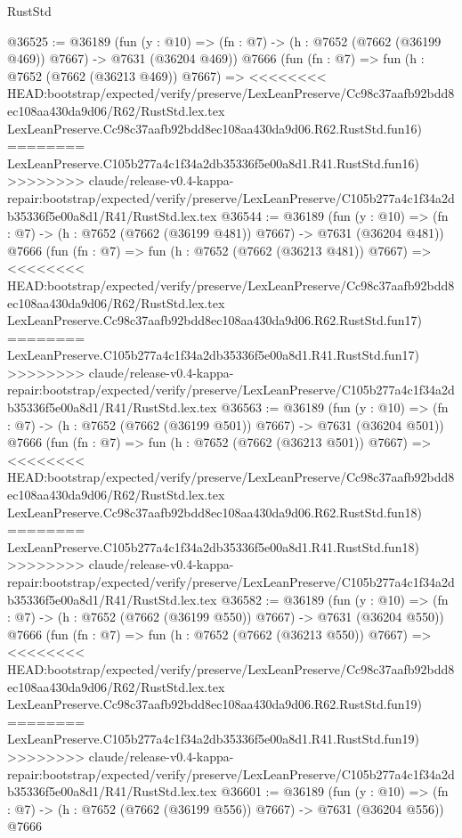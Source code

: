 \begin{lexlean}{RustStd}
\begin{coremodule}
{\begin{coremodule}
{{{{{{{{{{{{{{{{{{{{{{{{{{{{{{{{{{{{{{{{{{{{{{{{{{{{{@36525 := @36189
    (fun (y : @10) => (fn : @7) -> (h : @7652 (@7662 (@36199 @469)) @7667) -> @7631 (@36204 @469))
    @7666
    (fun (fn : @7) =>
    fun (h : @7652 (@7662 (@36213 @469)) @7667) =>
<<<<<<<< HEAD:bootstrap/expected/verify/preserve/LexLeanPreserve/Cc98c37aafb92bdd8ec108aa430da9d06/R62/RustStd.lex.tex
    LexLeanPreserve.Cc98c37aafb92bdd8ec108aa430da9d06.R62.RustStd.fun16)
========
    LexLeanPreserve.C105b277a4c1f34a2db35336f5e00a8d1.R41.RustStd.fun16)
>>>>>>>> claude/release-v0.4-kappa-repair:bootstrap/expected/verify/preserve/LexLeanPreserve/C105b277a4c1f34a2db35336f5e00a8d1/R41/RustStd.lex.tex
@36544 := @36189
    (fun (y : @10) => (fn : @7) -> (h : @7652 (@7662 (@36199 @481)) @7667) -> @7631 (@36204 @481))
    @7666
    (fun (fn : @7) =>
    fun (h : @7652 (@7662 (@36213 @481)) @7667) =>
<<<<<<<< HEAD:bootstrap/expected/verify/preserve/LexLeanPreserve/Cc98c37aafb92bdd8ec108aa430da9d06/R62/RustStd.lex.tex
    LexLeanPreserve.Cc98c37aafb92bdd8ec108aa430da9d06.R62.RustStd.fun17)
========
    LexLeanPreserve.C105b277a4c1f34a2db35336f5e00a8d1.R41.RustStd.fun17)
>>>>>>>> claude/release-v0.4-kappa-repair:bootstrap/expected/verify/preserve/LexLeanPreserve/C105b277a4c1f34a2db35336f5e00a8d1/R41/RustStd.lex.tex
@36563 := @36189
    (fun (y : @10) => (fn : @7) -> (h : @7652 (@7662 (@36199 @501)) @7667) -> @7631 (@36204 @501))
    @7666
    (fun (fn : @7) =>
    fun (h : @7652 (@7662 (@36213 @501)) @7667) =>
<<<<<<<< HEAD:bootstrap/expected/verify/preserve/LexLeanPreserve/Cc98c37aafb92bdd8ec108aa430da9d06/R62/RustStd.lex.tex
    LexLeanPreserve.Cc98c37aafb92bdd8ec108aa430da9d06.R62.RustStd.fun18)
========
    LexLeanPreserve.C105b277a4c1f34a2db35336f5e00a8d1.R41.RustStd.fun18)
>>>>>>>> claude/release-v0.4-kappa-repair:bootstrap/expected/verify/preserve/LexLeanPreserve/C105b277a4c1f34a2db35336f5e00a8d1/R41/RustStd.lex.tex
@36582 := @36189
    (fun (y : @10) => (fn : @7) -> (h : @7652 (@7662 (@36199 @550)) @7667) -> @7631 (@36204 @550))
    @7666
    (fun (fn : @7) =>
    fun (h : @7652 (@7662 (@36213 @550)) @7667) =>
<<<<<<<< HEAD:bootstrap/expected/verify/preserve/LexLeanPreserve/Cc98c37aafb92bdd8ec108aa430da9d06/R62/RustStd.lex.tex
    LexLeanPreserve.Cc98c37aafb92bdd8ec108aa430da9d06.R62.RustStd.fun19)
========
    LexLeanPreserve.C105b277a4c1f34a2db35336f5e00a8d1.R41.RustStd.fun19)
>>>>>>>> claude/release-v0.4-kappa-repair:bootstrap/expected/verify/preserve/LexLeanPreserve/C105b277a4c1f34a2db35336f5e00a8d1/R41/RustStd.lex.tex
@36601 := @36189
    (fun (y : @10) => (fn : @7) -> (h : @7652 (@7662 (@36199 @556)) @7667) -> @7631 (@36204 @556))
    @7666
}}}}}}}}}}}}}}}}}}}}}}}}}}}}}}}}}}}}}}}}}}}}}}}}}}}}}
\end{coremodule}}
\end{coremodule}
\end{lexlean}
